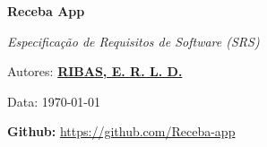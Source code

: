 \begin{titlepage}
    \centering
    {\Huge\bfseries Receba App \par}
    \vspace{2cm}
    {\Large\itshape Especificação de Requisitos de Software (SRS)\par}
    \vspace{3cm}
    {\large
        Autores: \href{https://github.com/oenzoribas}{\textbf{RIBAS, E. R. L. D.}} \par
        
        Data: \today\par
    }
    \vfill
    {\large
        \textbf{Github:} \url{https://github.com/Receba-app}
    }
\end{titlepage}
